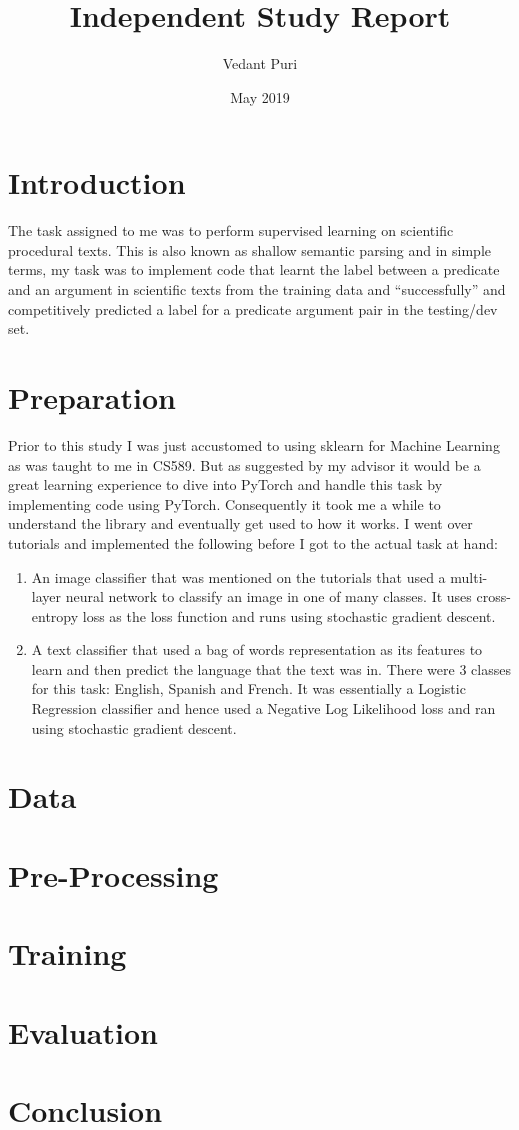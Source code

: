 \documentclass{article}
\title{Independent Study Report}
\author{Vedant Puri}
\date{May 2019}
\begin{document}
\maketitle

\section{Introduction}
The task assigned to me was to perform supervised learning on scientific procedural texts. This is also known as shallow semantic parsing and in simple terms, my task was to implement code that learnt the label between a predicate and an argument in scientific texts from the training data and ``successfully'' and competitively predicted a label for a predicate argument pair in the testing/dev set.

\section{Preparation}
Prior to this study I was just accustomed to using sklearn for Machine Learning as was taught to me in CS589. But as suggested by my advisor it would be a great learning experience to dive into PyTorch and handle this task by implementing code using PyTorch. Consequently it took me a while to understand the library and eventually get used to how it works. I went over tutorials and implemented the following before I got to the actual task at hand:

\begin{enumerate}
    \item An image classifier that was mentioned on the tutorials that used a multi-layer neural network to classify an image in one of many classes. It uses cross-entropy loss as the loss function and runs using stochastic gradient descent.
    \item A text classifier that used a bag of words representation as its features to learn and then predict the language that the text was in. There were 3 classes for this task: English, Spanish and French. It was essentially a Logistic Regression classifier and hence used a Negative Log Likelihood loss and ran using stochastic gradient descent.
\end{enumerate}


\section{Data}

\section{Pre-Processing}

\section{Training}

\section{Evaluation}

\section{Conclusion}
\end{document}
